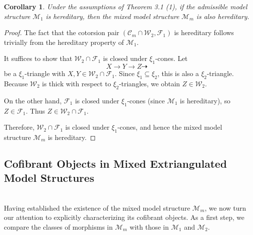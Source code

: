 \documentclass[11pt,a4paper]{amsart}
\numberwithin{equation}{section}
\theoremstyle{plain}
\newtheorem{cor}[thm]{Corollary}
\begin{document}
\begin{cor}
	Under the assumptions of Theorem 3.1 (1), if the admissible model structure $\mathcal{M}_1$ is hereditary, then the mixed model structure $\mathcal{M}_m$ is also hereditary.
\end{cor}

\begin{proof}
	The fact that the cotorsion pair $(\mathcal{C}_m\cap\mathcal{W}_2, \mathcal{F}_1)$ is hereditary follows trivially from the hereditary property of $\mathcal{M}_1$.
	
	It suffices to show that $\mathcal{W}_2\cap\mathcal{F}_1$ is closed under $\xi_1$-cones. Let
	\[ X \longrightarrow Y \longrightarrow Z \dashrightarrow \]
	be a $\xi_1$-triangle with $X, Y\in\mathcal{W}_2\cap\mathcal{F}_1$. Since $\xi_1\subseteq\xi_2$, this is also a $\xi_2$-triangle. Because $\mathcal{W}_2$ is thick with respect to $\xi_2$-triangles, we obtain $Z\in\mathcal{W}_2$.
	
	On the other hand, $\mathcal{F}_1$ is closed under $\xi_1$-cones (since $\mathcal{M}_1$ is hereditary), so $Z\in\mathcal{F}_1$. Thus $Z\in\mathcal{W}_2\cap\mathcal{F}_1$.
	
	Therefore, $\mathcal{W}_2\cap\mathcal{F}_1$ is closed under $\xi_1$-cones, and hence the mixed model structure $\mathcal{M}_m$ is hereditary.
\end{proof}






\subsection{Coﬁbrant Objects in Mixed Extriangulated Model Structures}
\noindent\\

Having established the existence of the mixed model structure $\mathcal{M}_m$, we now turn our attention to explicitly characterizing its cofibrant objects. As a first step, we compare the classes of morphisms in $\mathcal{M}_m$ with those in $\mathcal{M}_1$ and $\mathcal{M}_2$.
\end{document}
